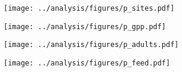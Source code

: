 \documentclass[12pt]{article}
\begin{document}
\clearpage




\begin{figure}
\centering
\texttt{[image: ../analysis/figures/p\_sites.pdf]}
\caption{\label{fig:sites}
}
\end{figure}

\clearpage




\begin{figure}
\centering
\texttt{[image: ../analysis/figures/p\_gpp.pdf]}
\caption{\label{fig:gpp}
}
\end{figure}

\clearpage




\begin{figure}
\centering
\texttt{[image: ../analysis/figures/p\_adults.pdf]}
\caption{\label{fig:adults}
}
\end{figure}

\clearpage


\begin{figure}
\centering
\texttt{[image: ../analysis/figures/p\_feed.pdf]}
\caption{\label{fig:feed}
}
\end{figure}

\clearpage





\end{document}
